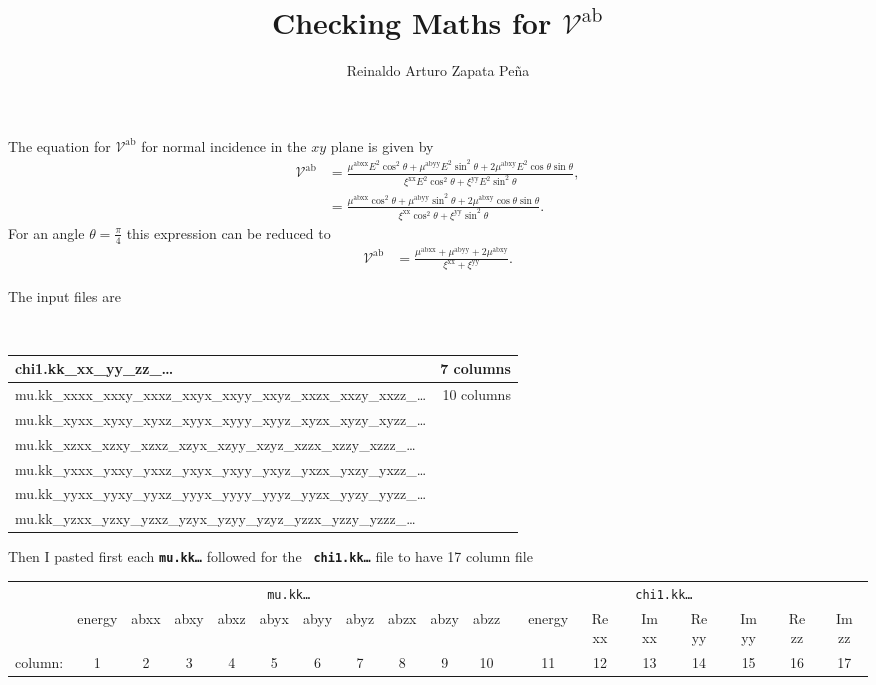 \documentclass[landscape]{article}
\author{Reinaldo Arturo Zapata Pe\~na}
\title{Checking Maths for $\mathcal{V}^{\mathrm{ab}}$}
\date{}
\begin{document}
\maketitle

The equation for $\mathcal{V}^{\mathrm{ab}}$ for normal incidence in the $xy$ plane
is given by
\begin{align*}
\mathcal{V}^{\mathrm{ab}} 
&= \frac{\mu^{\mathrm{abxx}}E^{2}\cos^{2}\theta + 
\mu^{\mathrm{abyy}}E^{2}\sin^{2}\theta + 
2\mu^{\mathrm{abxy}}E^{2}\cos\theta\sin\theta }
{\xi^{\mathrm{xx}}E^{2}\cos^{2}\theta + \xi^{\mathrm{yy}}E^{2}\sin^{2}\theta}, \\
&= \frac{\mu^{\mathrm{abxx}}\cos^{2}\theta + 
\mu^{\mathrm{abyy}}\sin^{2}\theta + 2\mu^{\mathrm{abxy}}\cos\theta\sin\theta }
{\xi^{\mathrm{xx}}\cos^{2}\theta + \xi^{\mathrm{yy}}\sin^{2}\theta}.
\end{align*}
For an angle $\theta = \frac{\pi}{4}$ this expression can be reduced to 
\begin{align*}
\mathcal{V}^{\mathrm{ab}} 
&= \frac{\mu^{\mathrm{abxx}} + \mu^{\mathrm{abyy}} + 2\mu^{\mathrm{abxy}}}
{\xi^{\mathrm{xx}} + \xi^{\mathrm{yy}}}.
\end{align*}

The input files are

{\tt
\begin{tabular}{lr}
chi1.kk\_xx\_yy\_zz\_\ldots &  {\rm 7 columns} \\
\hline
mu.kk\_xxxx\_xxxy\_xxxz\_xxyx\_xxyy\_xxyz\_xxzx\_xxzy\_xxzz\_\ldots & {\rm 10 columns}\\
mu.kk\_xyxx\_xyxy\_xyxz\_xyyx\_xyyy\_xyyz\_xyzx\_xyzy\_xyzz\_\ldots & \\
mu.kk\_xzxx\_xzxy\_xzxz\_xzyx\_xzyy\_xzyz\_xzzx\_xzzy\_xzzz\_\ldots & \\
mu.kk\_yxxx\_yxxy\_yxxz\_yxyx\_yxyy\_yxyz\_yxzx\_yxzy\_yxzz\_\ldots & \\
mu.kk\_yyxx\_yyxy\_yyxz\_yyyx\_yyyy\_yyyz\_yyzx\_yyzy\_yyzz\_\ldots & \\
mu.kk\_yzxx\_yzxy\_yzxz\_yzyx\_yzyy\_yzyz\_yzzx\_yzzy\_yzzz\_\ldots & \\
\end{tabular}
}

\vspace{0.5cm}
Then I pasted first each \textbf{\tt mu.kk\ldots} followed for the \textbf{\tt
chi1.kk\ldots} file to have 17 column file

\vspace{0.5cm}
{\footnotesize
\begin{tabular}{lcccccccccccccccccc}
& \multicolumn{10}{c}{\tt mu.kk\ldots} & \multicolumn{7}{c}{\tt chi1.kk\ldots} \\
\cline {2-11} \cline{13-19}
&energy & abxx & abxy & abxz & abyx & abyy & abyz & abzx & abzy & abzz & &
energy & Re xx & Im xx & Re yy & Im yy & Re zz & Im zz \\
column: & 1& 2& 3& 4& 5& 6& 7& 8& 9& 10 & & 11& 12& 13& 14& 15& 16& 17\\
\end{tabular}
}
\end{document}
